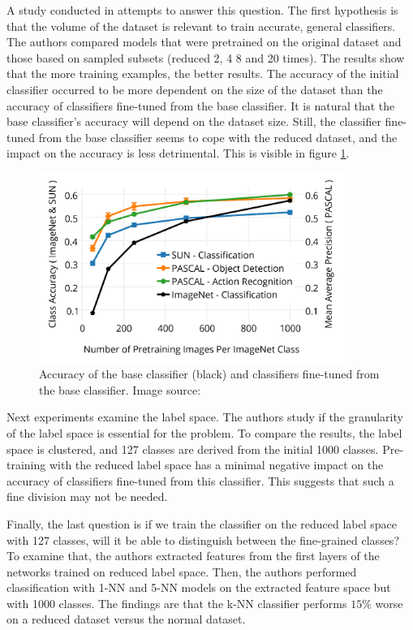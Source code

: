 \documentclass[a4paper,11pt,twoside]{report}
\theoremstyle{definition}
\begin{document}
\FloatBarrier

A study conducted in \cite{imagnet} attempts to answer this question. The first hypothesis is that the volume of the dataset is relevant to train accurate, general classifiers. The authors compared models that were pretrained on the original dataset and those based on sampled subsets (reduced 2, 4 8 and 20 times). The results show that the more training examples, the better results. The accuracy of the initial classifier occurred to be more dependent on the size of the dataset than the accuracy of classifiers fine-tuned from the base classifier. It is natural that the base classifier's accuracy will depend on the dataset size. Still, the classifier fine-tuned from the base classifier seems to cope with the reduced dataset, and the impact on the accuracy is less detrimental. This is visible in figure \ref{fig:size_acc_img}.

\FloatBarrier


\begin{figure}[h!]
\centering
\includegraphics[width=10cm]{imgs/imagenet_instances_accuracy.png}
\caption{Accuracy of the base classifier (black) and classifiers fine-tuned from the base classifier. Image source: \cite{imagnet}}
\label{fig:size_acc_img}
\end{figure}
\FloatBarrier

Next experiments examine the label space. The authors study if the granularity of the label space is essential for the problem. To compare the results, the label space is clustered, and 127 classes are derived from the initial 1000 classes. Pre-training with the reduced label space has a minimal negative impact on the accuracy of classifiers fine-tuned from this classifier. This suggests that such a fine division may not be needed.

Finally, the last question is if we train the classifier on the reduced label space with 127 classes, will it be able to distinguish between the fine-grained classes? To examine that, the authors extracted features from the first layers of the networks trained on reduced label space. Then, the authors performed classification with 1-NN and 5-NN models on the extracted feature space but with 1000 classes. The findings are that the k-NN classifier performs $15\%$ worse on a reduced dataset versus the normal dataset.
\end{document}
